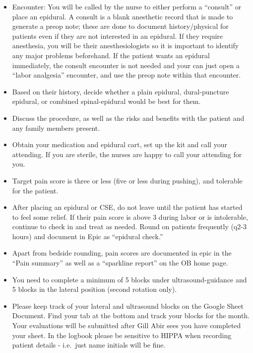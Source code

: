 \documentclass[twoside,8pt]{extarticle}
\providecommand{\tightlist}{%
}
\begin{document}
\begin{itemize}
\tightlist
\item
  Encounter: You will be called by the nurse to either perform a
  ``consult'' or place an epidural. A consult is a blank anesthetic
  record that is made to generate a preop note; these are done to
  document history/physical for patients even if they are not interested
  in an epidural. If they require anesthesia, you will be their
  anesthesiologists so it is important to identify any major problems
  beforehand. If the patient wants an epidural immediately, the consult
  encounter is not needed and your can just open a ``labor analgesia''
  encounter, and use the preop note within that encounter.
\item
  Based on their history, decide whether a plain epidural,
  dural-puncture epidural, or combined spinal-epidural would be best for
  them.
\item
  Discuss the procedure, as well as the risks and benefits with the
  patient and any family members present.
\item
  Obtain your medication and epidural cart, set up the kit and call your
  attending. If you are sterile, the nurses are happy to call your
  attending for you.
\item
  Target pain score is three or less (five or less during pushing), and
  tolerable for the patient.
\item
  After placing an epidural or CSE, do not leave until the patient has
  started to feel some relief. If their pain score is above 3 during
  labor or is intolerable, continue to check in and treat as needed.
  Round on patients frequently (q2-3 hours) and document in Epic as
  ``epidural check.''
\item
  Apart from bedside rounding, pain scores are documented in epic in the
  ``Pain summary'' as well as a ``sparkline report'' on the OB home
  page.
\item
  You need to complete a minimum of 5 blocks under ultrasound-guidance
  and 5 blocks in the lateral position (second rotation only).
\item
  Please keep track of your lateral and ultrasound blocks on the Google
  Sheet Document. Find your tab at the bottom and track your blocks for
  the month. Your evaluations will be submitted after Gill Abir sees you
  have completed your sheet. In the logbook please be sensitive to HIPPA
  when recording patient details - i.e.~just name initials will be fine.
\end{itemize}
\end{document}
